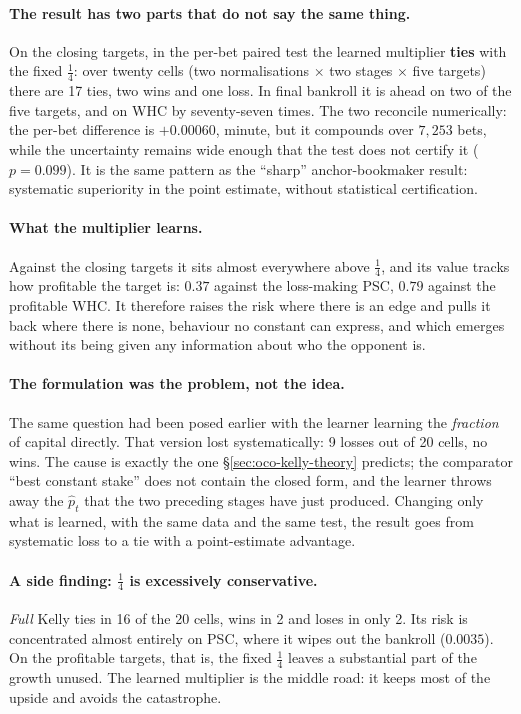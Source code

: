 \documentclass[12pt,a4paper,oneside]{report}
\renewcommand{\_}{\oldunderscore\allowbreak}
\theoremstyle{definition}
\theoremstyle{plain}
\theoremstyle{remark}
\begin{document}
\paragraph{The result has two parts that do not say the same thing.} On the closing targets, in
the per-bet paired test the learned multiplier \textbf{ties} with the fixed $\tfrac14$: over
twenty cells (two normalisations $\times$ two stages $\times$ five targets) there are 17 ties, two
wins and one loss. In final bankroll it is ahead on two of the five targets, and on WHC by seventy-seven
times. The two reconcile numerically: the per-bet difference is $+0.00060$, minute, but it
compounds over $7{,}253$ bets, while the uncertainty remains wide enough that the test does not
certify it ($p=0.099$). It is the same pattern as the ``sharp'' anchor-bookmaker result:
systematic superiority in the point estimate, without statistical certification.

\paragraph{What the multiplier learns.} Against the closing targets it sits almost everywhere
above $\tfrac14$, and its value tracks how profitable the target is: $0.37$ against the
loss-making PSC, $0.79$ against the profitable WHC. It therefore raises the risk where there is an edge and pulls it back where there
is none, behaviour no constant can express, and which emerges without its being given any
information about who the opponent is.

\paragraph{The formulation was the problem, not the idea.} The same question had been posed
earlier with the learner learning the \emph{fraction} of capital directly. That version lost
systematically: 9 losses out of 20 cells, no wins. The cause is exactly the one
\S\ref{sec:oco-kelly-theory} predicts; the comparator ``best constant stake'' does not contain
the closed form, and the learner throws away the $\hat{p}_t$ that the two preceding stages have
just produced. Changing only what is learned, with the same data and the same test, the result
goes from systematic loss to a tie with a point-estimate advantage.

\paragraph{A side finding: $\tfrac14$ is excessively conservative.} \emph{Full} Kelly ties in 16 of
the 20 cells, wins in 2 and loses in only 2. Its risk is concentrated almost entirely on PSC,
where it wipes out the bankroll ($0.0035$). On the profitable targets, that is, the fixed
$\tfrac14$ leaves a substantial part of the growth unused. The learned multiplier is the middle
road: it keeps most of the upside and avoids the catastrophe.
\end{document}

